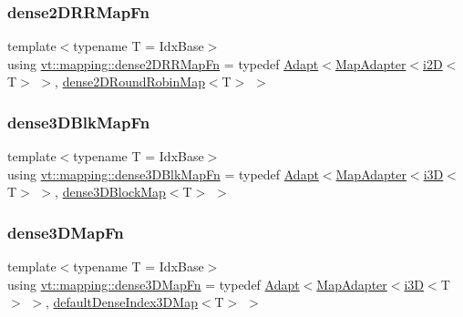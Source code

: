 \subsubsection{\texorpdfstring{dense2\+D\+R\+R\+Map\+Fn}{dense2DRRMapFn}}
{\footnotesize\ttfamily template$<$typename T  = Idx\+Base$>$ \\
using \hyperlink{namespacevt_1_1mapping_a6038870f6fcb87803b82114c71e6aa9b}{vt\+::mapping\+::dense2\+D\+R\+R\+Map\+Fn} = typedef \hyperlink{namespacevt_1_1mapping_ab3efa0ad45a85d80210d4acef3bb6c22}{Adapt}$<$\hyperlink{namespacevt_1_1mapping_a41b113c28bb6430fbcb5be66e08ccf9f}{Map\+Adapter}$<$\hyperlink{namespacevt_1_1mapping_a6448c875e0807b43f31e96fc5b0cec04}{i2D}$<$T$>$ $>$, \hyperlink{namespacevt_1_1mapping_ac606a5886c93a4dbb05dfead285c30c6}{dense2\+D\+Round\+Robin\+Map}$<$T$>$ $>$}

\mbox{\label{namespacevt_1_1mapping_af947e4c94da260154c26fdca517f1a79}} 
\subsubsection{\texorpdfstring{dense3\+D\+Blk\+Map\+Fn}{dense3DBlkMapFn}}
{\footnotesize\ttfamily template$<$typename T  = Idx\+Base$>$ \\
using \hyperlink{namespacevt_1_1mapping_af947e4c94da260154c26fdca517f1a79}{vt\+::mapping\+::dense3\+D\+Blk\+Map\+Fn} = typedef \hyperlink{namespacevt_1_1mapping_ab3efa0ad45a85d80210d4acef3bb6c22}{Adapt}$<$\hyperlink{namespacevt_1_1mapping_a41b113c28bb6430fbcb5be66e08ccf9f}{Map\+Adapter}$<$\hyperlink{namespacevt_1_1mapping_af435b967b9ed1ccb5ec4effdbd9abd13}{i3D}$<$T$>$ $>$, \hyperlink{namespacevt_1_1mapping_a91764d84e5e6d8253872740cb8424726}{dense3\+D\+Block\+Map}$<$T$>$ $>$}

\mbox{\label{namespacevt_1_1mapping_a9fd899bf55eeeeae4a8dac3f47fd88ad}} 
\subsubsection{\texorpdfstring{dense3\+D\+Map\+Fn}{dense3DMapFn}}
{\footnotesize\ttfamily template$<$typename T  = Idx\+Base$>$ \\
using \hyperlink{namespacevt_1_1mapping_a9fd899bf55eeeeae4a8dac3f47fd88ad}{vt\+::mapping\+::dense3\+D\+Map\+Fn} = typedef \hyperlink{namespacevt_1_1mapping_ab3efa0ad45a85d80210d4acef3bb6c22}{Adapt}$<$\hyperlink{namespacevt_1_1mapping_a41b113c28bb6430fbcb5be66e08ccf9f}{Map\+Adapter}$<$\hyperlink{namespacevt_1_1mapping_af435b967b9ed1ccb5ec4effdbd9abd13}{i3D}$<$T$>$ $>$, \hyperlink{namespacevt_1_1mapping_a776a69138a1fbceab5bbf10b9c07a858}{default\+Dense\+Index3\+D\+Map}$<$T$>$ $>$}

